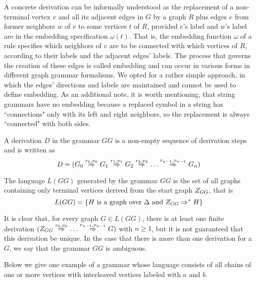 A concrete derivation can be informally understood as the replacement of a non-terminal vertex $v$ and all its adjacent edges in $G$ by a graph $R$ plus edges $e$ from former neighbors $w$ of $v$ to some vertices $t$ of $R$, provided $e$'s label and $w$'s label are in the embedding specification $\omega(t)$. That is, the embedding function $\omega$ of a rule specifies which neighbors of $v$ are to be connected with which vertices of $R$, according to their labels and the adjacent edges' labels. The process that governs the creation of these edges is called embedding and can occur in various forms in different graph grammar formalisms. We opted for a rather simple approach, in which the edges' directions and labels are maintained and cannot be used to define embedding. As an additional note, it is worth mentioning, that string grammars have no embedding because a replaced symbol in a string has ``connections" only with its left and right neighbors, so the replacement is always ``connected" with both sides.

\begin{definition}
	A derivation $D$ in the grammar $GG$ is a non-empty sequence of derivation steps and is written as
	\[ 
		D = (G_0 \deriv{r_0}{v_0}{} G_1 \deriv{r_1}{v_1}{} G_2 \deriv{r_2}{v_2}{} \dots \deriv{r_{n-1}}{v_{n-1}}{} G_n)
	\]
\end{definition}

\begin{definition}
	The language $L(GG)$ generated by the grammar $GG$ is the set of all graphs containing only terminal vertices derived from the start graph $Z_{GG}$, that is
	\[
		L(GG) = \{H \text{ is a graph over } \Delta \text{ and } Z_{GG} \Rightarrow^*_{} H\}
	\]
\end{definition}

It is clear that, for every graph $G \in L(GG)$, there is at least one finite derivation $(\startG{GG} \deriv{r_0}{v_0}{} \dots \deriv{r_{n-1}}{v_{n-1}}{} G)$ with $n \ge 1$, but it is not guaranteed that this derivation be unique. In the case that there is more than one derivation for a $G$, we say that the grammar $GG$ is ambiguous.

Below we give one example of a grammar whose language consists of all chains of one or more vertices with interleaved vertices labeled with $a$ and $b$.

